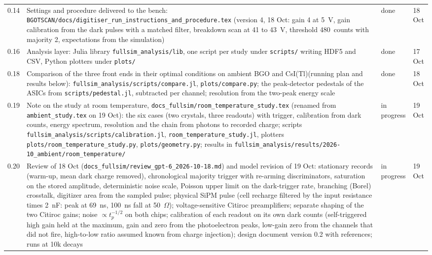 \documentclass[11pt]{article}
\newcommand{\code}[1]{\texttt{#1}}
\newcommand{\csitl}{CsI(Tl)\xspace}
\newcommand{\doing}{in progress}
\newcommand{\done}{done}
\begin{document}
\begin{longtable}{p{} p{} p{} p{}}
0.14 & Settings and procedure delivered to the bench: \code{BGOTSCAN/docs/digitiser\_run\_instructions\_and\_procedure.tex} (version 4, 18 Oct: gain 4 at 5~V, gain calibration from the dark pulses with a matched filter, breakdown scan at 41 to 43~V, threshold 480~counts with majority 2, expectations from the simulation) & \done & 18 Oct \\
0.16 & Analysis layer: Julia library \code{fullsim\_analysis/lib}, one script per study under \code{scripts/} writing HDF5 and CSV, Python plotters under \code{plots/} & \done & 17 Oct \\
0.18 & Comparison of the three front ends in their optimal conditions on ambient BGO and \csitl (running plan and results below): \code{fullsim\_analysis/scripts/compare.jl}, \code{plots/compare.py}; the peak-detector pedestals of the ASICs from \code{scripts/pedestal.jl}, subtracted per channel; resolution from the two-peak energy scale & \done & 18 Oct \\
0.19 & Note on the study at room temperature, \code{docs\_fullsim/room\_temperature\_study.tex} (renamed from \code{ambient\_study.tex} on 19 Oct): the six cases (two crystals, three readouts) with trigger, calibration from dark counts, energy spectrum, resolution and the chain from photons to recorded charge; scripts \code{fullsim\_analysis/scripts/calibration.jl}, \code{room\_temperature\_study.jl}, plotters \code{plots/room\_temperature\_study.py}, \code{plots/geometry.py}; results in \code{fullsim\_analysis/results/2026-10\_ambient/room\_temperature/} & \doing & 19 Oct \\
0.20 & Review of 18 Oct (\code{docs\_fullsim/review\_gpt-6\_2026-10-18.md}) and model revision of 19 Oct: stationary records (warm-up, mean dark charge removed), chronological majority trigger with re-arming discriminators, saturation on the stored amplitude, deterministic noise scale, Poisson upper limit on the dark-trigger rate, branching (Borel) crosstalk, digitizer area from the sampled pulse; physical SiPM pulse (cell recharge filtered by the input resistance times 2~nF: peak at 69~ns, 100~ns fall at 50~$\Omega$); voltage-sensitive Citiroc preamplifiers; separate shaping of the two Citiroc gains; noise $\propto t_p^{-1/2}$ on both chips; calibration of each readout on its own dark counts (self-triggered high gain held at the maximum, gain and zero from the photoelectron peaks, low-gain zero from the channels that did not fire, high-to-low ratio assumed known from charge injection); design document version 0.2 with references; runs at 10k decays & \doing & 19 Oct \\

\end{longtable}
\end{document}
